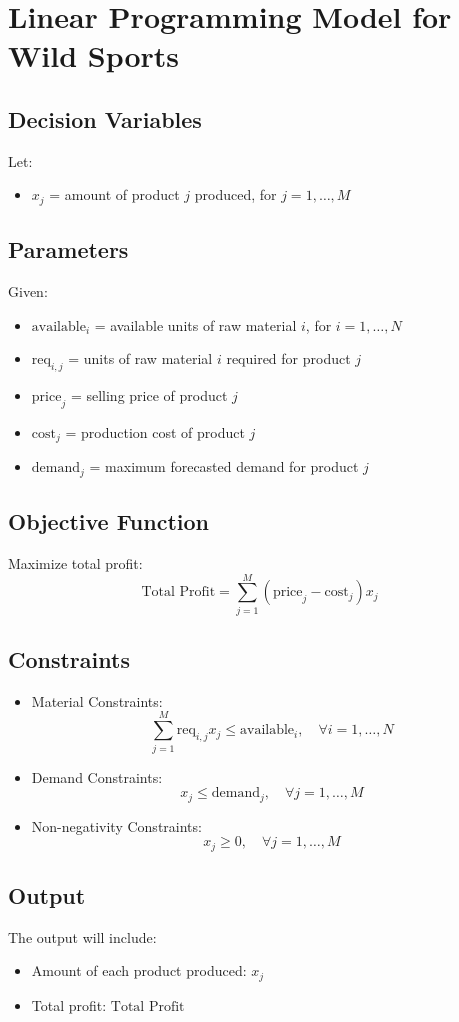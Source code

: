 \documentclass{article}
\begin{document}
\section*{Linear Programming Model for Wild Sports}

\subsection*{Decision Variables}
Let:
\begin{itemize}
    \item \( x_j \) = amount of product \( j \) produced, for \( j = 1, \ldots, M \)
\end{itemize}

\subsection*{Parameters}
Given:
\begin{itemize}
    \item \( \text{available}_i \) = available units of raw material \( i \), for \( i = 1, \ldots, N \)
    \item \( \text{req}_{i,j} \) = units of raw material \( i \) required for product \( j \)
    \item \( \text{price}_j \) = selling price of product \( j \)
    \item \( \text{cost}_j \) = production cost of product \( j \)
    \item \( \text{demand}_j \) = maximum forecasted demand for product \( j \)
\end{itemize}

\subsection*{Objective Function}
Maximize total profit:
\[
\text{Total Profit} = \sum_{j=1}^{M} ( \text{price}_j - \text{cost}_j ) x_j
\]

\subsection*{Constraints}
\begin{itemize}
    \item Material Constraints:
\[
\sum_{j=1}^{M} \text{req}_{i,j} x_j \leq \text{available}_i, \quad \forall i = 1, \ldots, N
\]
    
    \item Demand Constraints:
\[
x_j \leq \text{demand}_j, \quad \forall j = 1, \ldots, M
\]

    \item Non-negativity Constraints:
\[
x_j \geq 0, \quad \forall j = 1, \ldots, M
\]
\end{itemize}

\subsection*{Output}
The output will include:
\begin{itemize}
    \item Amount of each product produced: \( x_j \)
    \item Total profit: \( \text{Total Profit} \)
\end{itemize}
\end{document}
